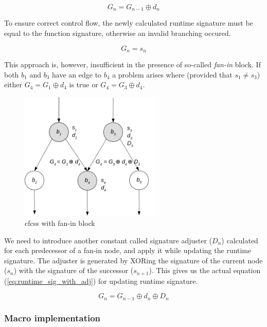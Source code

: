 \begin{equation}
\label{eq:runtime_sig}
G_n = G_{n-1} \oplus d_n
\end{equation}

To ensure correct control flow, the newly calculated runtime signature must be equal to the function signature, otherwise an invalid branching occured.

\begin{equation}
\label{eq:sig_check}
G_n = s_n
\end{equation}

This approach is, however, insufficient in the presence of so-called \textit{fan-in} block. If both {$b_1$} and {$b_3$} have an edge to {$b_4$} a problem arises where (provided that {$s_1 \ne s_3$}) either {$G_4 = G_1 \oplus d_4$} is true or {$G_4 = G_3 \oplus d_4$}.

\begin{figure}[!h]
    \centering
    \includegraphics[width=0.6\textwidth]{diagrams/cfcss/adjuster.png}
    \caption{\acrshort{cfcss} with fan-in block \cite{coast:cfcss}}
\end{figure}

We need to introduce another constant called signature adjuster ({$D_n$}) calculated for each predecessor of a fan-in node, and apply it while updating the runtime signature. The adjuster is generated by XORing the signature of the current node ({$s_n$}) with the signature of the successor ({$s_{n+1}$}). This gives us the actual equation (\ref{eq:runtime_sig_with_adj}) for updating runtime signature.

\begin{equation}
\label{eq:runtime_sig_with_adj}
G_n = G_{n-1} \oplus d_n \oplus D_n
\end{equation}

\subsubsection{Macro implementation}

